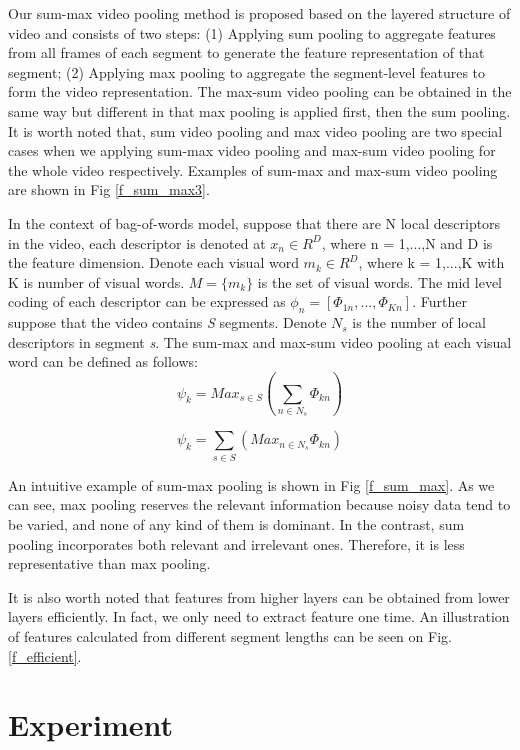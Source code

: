 Our sum-max video pooling method is proposed based on the layered structure of video and consists of two steps: (1) Applying sum pooling to aggregate features from all frames of each segment to generate the feature representation of that segment; (2) Applying max pooling to aggregate the segment-level features to form the video representation. The max-sum video pooling can be obtained in the same way but different in that max pooling is applied first, then the sum pooling. It is worth noted that, sum video pooling and max video pooling are two special cases when we applying sum-max video pooling and max-sum video pooling for the whole video respectively. Examples of sum-max and max-sum video pooling are shown in Fig \ref{f_sum_max3}. 

In the context of bag-of-words model, suppose that there are N local descriptors in the video, each descriptor is denoted at $x_{n} \in R^{D}$, where n = 1,...,N and D is the feature dimension. Denote each visual word $m_{k} \in R^{D}$, where k = 1,...,K with K is number of visual words. $M = \{m_{k}\}$ is the set of visual words. The mid level coding of each descriptor can be expressed as $\phi_{n} = [\Phi_{1n},...,\Phi_{Kn}]$. Further suppose that the video contains \textit{S} segments. Denote $N_{s}$ is the number of local descriptors in segment \textit{s}. The sum-max and max-sum video pooling at each visual word can be defined as follows:
\begin{equation}\psi_{k} = Max_{s \in S}(\sum_{n \in N_{s}}\Phi_{kn})\end{equation}

\begin{equation}\psi_{k} = \sum_{s \in S}(Max_{n \in N_{s}}\Phi_{kn})\end{equation}

An intuitive example of sum-max pooling is shown in Fig \ref{f_sum_max}. As we can see, max pooling reserves the relevant information because noisy data tend to be varied, and none of any kind of them is dominant. In the contrast, sum pooling incorporates both relevant and irrelevant ones. Therefore, it is less representative than max pooling.

It is also worth noted that features from higher layers can be obtained from lower layers efficiently. In fact, we only need to extract feature one time. An illustration of features calculated from different segment lengths can be seen on Fig. \ref{f_efficient}.

\section{Experiment}
\label{c4_experiment}
